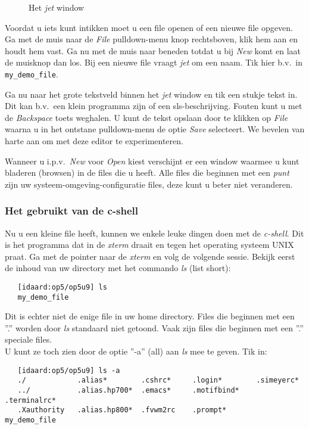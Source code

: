 \begin{figure}[bth]
\centerline{}
\caption{Het {\em jet} window
\label{jet_1}}
\end{figure}

Voordat u iets kunt intikken moet u een file openen of
een nieuwe file opgeven.
Ga met de muis naar de {\em File} pulldown-menu knop rechtsboven,
klik hem aan en houdt hem vast.
Ga nu met de muis naar beneden totdat u bij {\em New} komt en
laat de muisknop dan los.
Bij een nieuwe file vraagt {\em jet} om een naam.
Tik hier b.v.\ in {\tt my\_demo\_file}.

Ga nu naar het grote tekstveld binnen het {\em jet} window en
tik een stukje tekst in.
Dit kan b.v.\ een klein programma zijn of een sls-beschrijving.
Fouten kunt u met de {\em Backspace} toets weghalen.
U kunt de tekst opslaan door te klikken op {\em File} waarna
u in het ontstane pulldown-menu de optie {\em Save} selecteert.
We bevelen van harte aan om met deze editor te experimenteren.

Wanneer u i.p.v.\ {\em New} voor {\em Open} kiest verschijnt er een
window waarmee u kunt bladeren (browsen) in de files die u heeft.
Alle files die beginnen met een {\em punt} zijn uw
systeem-omgeving-configuratie files,
deze kunt u beter niet veranderen.

\subsubsection{Het gebruikt van de c-shell}
\label{Het gebruikt van de c-shell}
Nu u een kleine file heeft,
kunnen we enkele leuke dingen doen met de {\em c-shell}.
Dit is het programma dat in de {\em xterm} draait en
tegen het operating systeem UNIX praat.
Ga met de pointer naar de {\em xterm} en volg de volgende sessie.
Bekijk eerst de inhoud van uw directory met het commando {\em ls} (list short):
\begin{verbatim}
   [idaard:op5/op5u9] ls
   my_demo_file
\end{verbatim}

Dit is echter niet de enige file in uw home directory.
Files die beginnen met een ''.'' worden door {\em ls} standaard niet getoond.
Vaak zijn files die beginnen met een ''.'' speciale files.\\
U kunt ze toch zien door de optie ''-a'' (all) aan {\em ls} mee te geven.
Tik in:
\begin{verbatim}
   [idaard:op5/op5u9] ls -a
   ./            .alias*        .cshrc*     .login*        .simeyerc*
   ../           .alias.hp700*  .emacs*     .motifbind*    .terminalrc*
   .Xauthority   .alias.hp800*  .fvwm2rc    .prompt*       my_demo_file
\end{verbatim}

